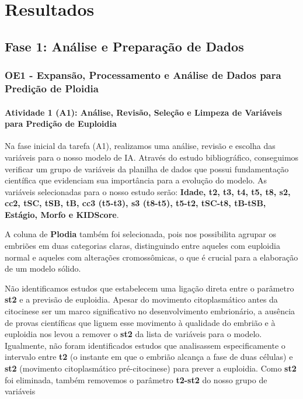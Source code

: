 \chapter[Metodologia]{Resultados}

\section{Fase 1: Análise e Preparação de Dados}
\subsection{OE1 - Expansão, Processamento e Análise de Dados para Predição de Ploidia}
\subsubsection{Atividade 1 (A1): Análise, Revisão, Seleção e Limpeza de Variáveis para Predição de Euploidia}
Na fase inicial da tarefa (A1), realizamos uma análise, revisão e escolha das variáveis para o nosso modelo de IA. Através do estudo bibliográfico, conseguimos verificar um grupo de variáveis da planilha de dados que possui fundamentação científica que evidenciam sua importância para a evolução do modelo. As variáveis selecionadas para o nosso estudo serão: \textbf{Idade, t2, t3, t4, t5, t8, s2, cc2, tSC, tSB, tB, cc3 (t5-t3), s3 (t8-t5), t5-t2, tSC-t8, tB-tSB, Estágio, Morfo e KIDScore}. 

A coluna de \textbf{Plodia} também foi selecionada, pois nos possibilita agrupar os embriões em duas categorias claras, distinguindo entre aqueles com euploidia normal e aqueles com alterações cromossômicas, o que é crucial para a elaboração de um modelo sólido.

Não identificamos estudos que estabelecem uma ligação direta entre o parâmetro \textbf{st2} e a previsão de euploidia. Apesar do movimento citoplasmático antes da citocinese ser um marco significativo no desenvolvimento embrionário, a ausência de provas científicas que liguem esse movimento à qualidade do embrião e à euploidia nos levou a remover o \textbf{st2} da lista de variáveis para o modelo. Igualmente, não foram identificados estudos que analisassem especificamente o intervalo entre \textbf{t2} (o instante em que o embrião alcança a fase de duas células) e \textbf{st2} (movimento citoplasmático pré-citocinese) para prever a euploidia. Como \textbf{st2} foi eliminada, também removemos o parâmetro \textbf{t2-st2} do nosso grupo de variáveis

